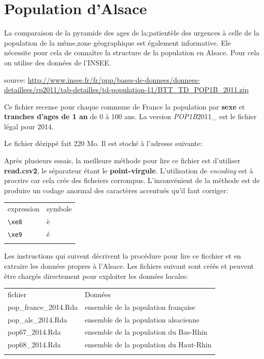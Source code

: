 \documentclass[]{article}
\begin{document}
\section{Population d'Alsace}\label{population-dalsace}

La comparaison de la pyramide des ages de la;patientèle des urgences à
celle de la population de la même,zone géographique est également
informative. Ele nécessite pour cela de connaître la structure de la
population en Alsace. Pour cela on utilise des données de l'INSEE.

source:
\url{http://www.insee.fr/fr/ppp/bases-de-donnees/donnees-detaillees/rp2011/tab-detailles/td-population-11/BTT_TD_POP1B_2011.zip}

Ce fichier recense pour chaque commune de France la population par
\textbf{sexe} et \textbf{tranches d'ages de 1 an} de 0 à 100 ans. La
version \emph{POP1B}2011\_ est le fichier légal pour 2014.

Le fichier dézippé fait 220 Mo. Il est stocké à l'adresse suivante:

Après plusieurs essais, la meilleure méthode pour lire ce fichier est
d'utiliser \textbf{read.csv2}, le séparateur étant le
\textbf{point-virgule}. L'utilisation de \emph{encoding} est à procrire
car cela crée des ficheiers corrompus. L'inconvénient de la méthode est
de produire un codage anormal des caractères accentués qu'il faut
corriger:

\begin{longtable}[c]{@{}ll@{}}
\toprule\addlinespace
expression & symbole
\\\addlinespace
\midrule\endhead
\texttt{\textbackslash{}xe8} & è
\\\addlinespace
\texttt{\textbackslash{}xe9} & é
\\\addlinespace
\bottomrule
\end{longtable}

Les instructions qui suivent décrivent la procédure pour lire ce
ficchier et en extraire les données propres à l'Alsace. Les fichiers
suivant sont créés et peuvent être chargés directement pour exploiter
les données locales:

\begin{longtable}[c]{@{}ll@{}}
\toprule\addlinespace
fichier & Données
\\\addlinespace
\midrule\endhead
pop\_france\_2014.Rda & ensemble de la population française
\\\addlinespace
pop\_als\_2014.Rda & ensemble de la population alsacienne
\\\addlinespace
pop67\_2014.Rda & ensemble de la population du Bas-Rhin
\\\addlinespace
pop68\_2014.Rda & ensemble de la population du Haut-Rhin
\\\addlinespace
\bottomrule
\end{longtable}
\end{document}
